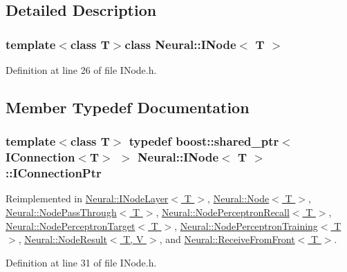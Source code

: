 \subsection{Detailed Description}
\subsubsection*{template$<$class T$>$class Neural::INode$<$ T $>$}



Definition at line 26 of file INode.h.



\subsection{Member Typedef Documentation}
\hypertarget{class_neural_1_1_i_node_a5243be0a422bcddc5a71a79920d09fd1}{
\subsubsection[{IConnectionPtr}]{\setlength{\rightskip}{0pt plus 5cm}template$<$class T$>$ typedef boost::shared\_\-ptr$<$ {\bf IConnection}$<$T$>$ $>$ {\bf Neural::INode}$<$ T $>$::{\bf IConnectionPtr}}}
\label{class_neural_1_1_i_node_a5243be0a422bcddc5a71a79920d09fd1}


Reimplemented in \hyperlink{class_neural_1_1_i_node_layer_ab117db196ffa2ff59c58bc3a4fbdfa09}{Neural::INodeLayer$<$ T $>$}, \hyperlink{class_neural_1_1_node_ac797b836161befa12cd9897926139c14}{Neural::Node$<$ T $>$}, \hyperlink{class_neural_1_1_node_pass_through_abad3481def64e79eb5d4c7e1a9155106}{Neural::NodePassThrough$<$ T $>$}, \hyperlink{class_neural_1_1_node_perceptron_recall_a3810ccef790454bbb05dcb86a1743d30}{Neural::NodePerceptronRecall$<$ T $>$}, \hyperlink{class_neural_1_1_node_perceptron_target_abdb5cb819de661fc83edb4eceb81f7e8}{Neural::NodePerceptronTarget$<$ T $>$}, \hyperlink{class_neural_1_1_node_perceptron_training_acf502a8079c8e875773ac940986af738}{Neural::NodePerceptronTraining$<$ T $>$}, \hyperlink{class_neural_1_1_node_result_adff4d0f9fa1cfcafd13113a00b7a3ff7}{Neural::NodeResult$<$ T, V $>$}, and \hyperlink{class_neural_1_1_receive_from_front_abf496040ce9745e7e1fc8274f9492295}{Neural::ReceiveFromFront$<$ T $>$}.



Definition at line 31 of file INode.h.

